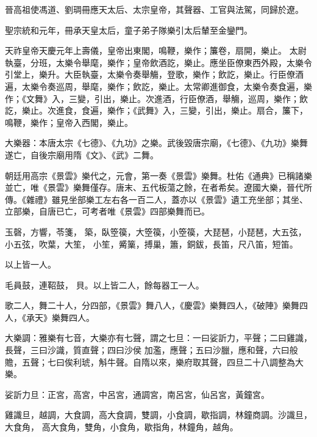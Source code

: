 \begin{pinyinscope}
 晉高祖使馮道、劉琱冊應天太后、太宗皇帝，其聲器、工官與法駕，同歸於遼。



 聖宗統和元年，冊承天皇太后，童子弟子隊樂引太后輦至金鑾門。



 天祚皇帝天慶元年上壽儀，皇帝出東閣，鳴鞭，樂作；簾卷，扇開，樂止。
 太尉執臺，分班，太樂令舉麾，樂作；皇帝飲酒訖，樂止。應坐臣僚東西外殿，太樂令引堂上，樂升。大臣執臺，太樂令奏舉觴，登歌，樂作；飲訖，樂止。行臣僚酒遍，太樂令奏巡周，舉麾，樂作；飲訖，樂止。太常卿進御食，太樂令奏食遍，樂作；《文舞》入，三變，引出，樂止。次進酒，行臣僚酒，舉觴，巡周，樂作；飲訖，樂止。次進食，食遍，樂作；《武舞》入，三變，引出，樂止。扇合，簾下，鳴鞭，樂作；皇帝入西閣，樂止。



 大樂器：本唐太宗《七德》、《九功》之樂。武後毀唐宗廟，《七德》、《九功》樂舞遂亡，自後宗廟用隋《文》、《武》二舞。



 朝廷用高宗《景雲》樂代之，元會，第一奏《景雲》樂舞。杜佑《通典》已稱諸樂並亡，唯《景雲》樂舞僅存。唐末、五代板蕩之餘，在者希矣。遼國大樂，晉代所傳。《雜禮》雖見坐部樂工左右各一百二人，蓋亦以《景雲》遺工充坐部；其坐、立部樂，自唐已亡，可考者唯《景雲》四部樂舞而已。



 玉磬，方響，苓箋，
 築，臥箜篌，大箜篌，小箜篌，大琵琶，小琵琶，大五弦，小五弦，吹葉，大笙，
 小笙，觱篥，搏巢，簫，銅鈸，長笛，尺八笛，短笛。



 以上皆一人。



 毛員鼓，連鞀鼓，
 貝。以上皆二人，餘每器工一人。



 歌二人，舞二十人，分四部，《景雲》舞八人，《慶雲》樂舞四人，《破陣》樂舞四人，《承天》樂舞四人。



 大樂調：雅樂有七音，大樂亦有七聲，謂之七旦：一曰娑訢力，平聲；二曰雞識，長聲，三曰沙識，質直聲；四曰沙侯
 加濫，應聲；五曰沙臘，應和聲，六曰般贍，五聲；七曰俟利琥，斛牛聲。自隋以來，樂府取其聲，四旦二十八調整為大樂。



 娑訢力旦：正宮，高宮，中呂宮，通調宮，南呂宮，仙呂宮，黃鐘宮。



 雞識旦，越調，大食調，高大食調，雙調，小食調，歇指調，林鐘商調。沙識旦，大食角，
 高大食角，雙角，小食角，歇指角，林鐘角，越角。




\end{pinyinscope}
